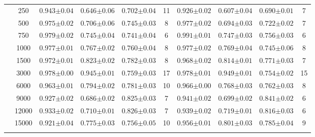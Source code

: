 \begin{table}[H]
\begin{tabularx}{\textwidth}{cc | YYYc | YYYc }
        & 250 & $0.943{\scriptscriptstyle\pm0.04}$ & $0.646{\scriptscriptstyle\pm0.06}$ & $0.702{\scriptscriptstyle\pm0.04}$ & 11 & $0.926{\scriptscriptstyle\pm0.02}$ & $0.607{\scriptscriptstyle\pm0.04}$ & $0.690{\scriptscriptstyle\pm0.01}$ & 7\\
        & 500 & $0.975{\scriptscriptstyle\pm0.02}$ & $0.706{\scriptscriptstyle\pm0.06}$ & $0.745{\scriptscriptstyle\pm0.03}$ & 8 & $0.977{\scriptscriptstyle\pm0.02}$ & $0.694{\scriptscriptstyle\pm0.03}$ & $0.722{\scriptscriptstyle\pm0.02}$ & 7\\
        & 750 & $0.979{\scriptscriptstyle\pm0.02}$ & $0.745{\scriptscriptstyle\pm0.04}$ & $0.741{\scriptscriptstyle\pm0.04}$ & 6 & $0.991{\scriptscriptstyle\pm0.01}$ & $0.747{\scriptscriptstyle\pm0.03}$ & $0.756{\scriptscriptstyle\pm0.03}$ & 6\\
        & 1000 & $0.977{\scriptscriptstyle\pm0.01}$ & $0.767{\scriptscriptstyle\pm0.02}$ & $0.760{\scriptscriptstyle\pm0.04}$ & 8 & $0.977{\scriptscriptstyle\pm0.02}$ & $0.769{\scriptscriptstyle\pm0.04}$ & $0.745{\scriptscriptstyle\pm0.06}$ & 8\\
        & 1500 & $0.972{\scriptscriptstyle\pm0.01}$ & $0.823{\scriptscriptstyle\pm0.02}$ & $0.782{\scriptscriptstyle\pm0.03}$ & 8 & $0.968{\scriptscriptstyle\pm0.02}$ & $0.814{\scriptscriptstyle\pm0.01}$ & $0.771{\scriptscriptstyle\pm0.03}$ & 7\\
        & 3000 & $0.978{\scriptscriptstyle\pm0.00}$ & $0.945{\scriptscriptstyle\pm0.01}$ & $0.759{\scriptscriptstyle\pm0.03}$ & 17 & $0.978{\scriptscriptstyle\pm0.01}$ & $0.949{\scriptscriptstyle\pm0.01}$ & $0.754{\scriptscriptstyle\pm0.02}$ & 15\\
        & 6000 & $0.963{\scriptscriptstyle\pm0.01}$ & $0.794{\scriptscriptstyle\pm0.02}$ & $0.781{\scriptscriptstyle\pm0.03}$ & 10 & $0.966{\scriptscriptstyle\pm0.00}$ & $0.768{\scriptscriptstyle\pm0.03}$ & $0.762{\scriptscriptstyle\pm0.03}$ & 8\\
        & 9000 & $0.927{\scriptscriptstyle\pm0.02}$ & $0.686{\scriptscriptstyle\pm0.02}$ & $0.825{\scriptscriptstyle\pm0.03}$ & 7 & $0.941{\scriptscriptstyle\pm0.02}$ & $0.699{\scriptscriptstyle\pm0.02}$ & $0.841{\scriptscriptstyle\pm0.02}$ & 6\\
        & 12000 & $0.933{\scriptscriptstyle\pm0.02}$ & $0.710{\scriptscriptstyle\pm0.01}$ & $0.826{\scriptscriptstyle\pm0.03}$ & 7 & $0.939{\scriptscriptstyle\pm0.02}$ & $0.719{\scriptscriptstyle\pm0.01}$ & $0.816{\scriptscriptstyle\pm0.03}$ & 6\\
        & 15000 & $0.921{\scriptscriptstyle\pm0.04}$ & $0.775{\scriptscriptstyle\pm0.03}$ & $0.756{\scriptscriptstyle\pm0.05}$ & 10 & $0.956{\scriptscriptstyle\pm0.01}$ & $0.801{\scriptscriptstyle\pm0.03}$ & $0.785{\scriptscriptstyle\pm0.04}$ & 9\\
        \\
    \end{tabularx}
\end{table}
\clearpage


